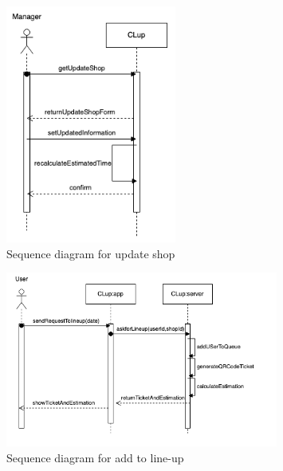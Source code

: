 \begin{figure}[H]
  \centering
  \includegraphics[width=0.5\textwidth,keepaspectratio]{images/UpdateShop_sd.png}
  \caption{Sequence diagram for update shop}
\end{figure}

\begin{figure}[H]
  \centering
  \includegraphics[width=0.8\textwidth,keepaspectratio]{images/AddToLineUp_sd.png}
  \caption{Sequence diagram for add to line-up}
\end{figure}

